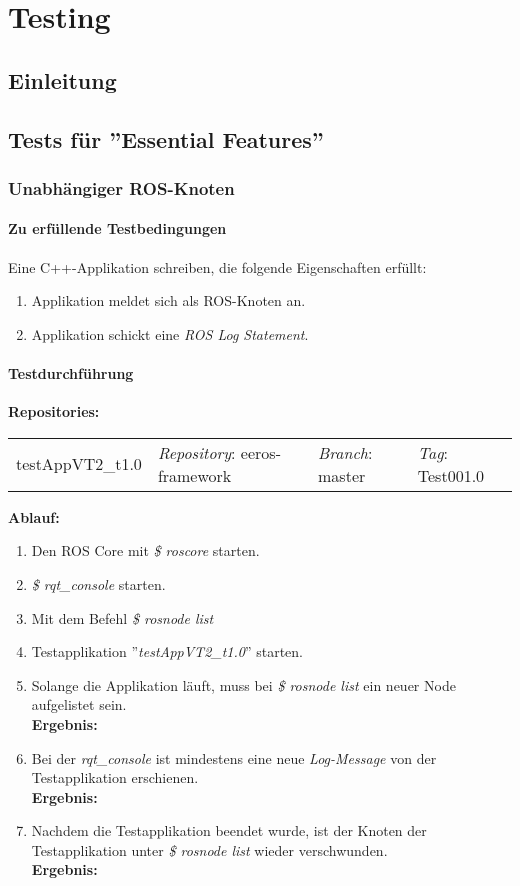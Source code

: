 \chapter{Testing}
\section{Einleitung}

\section{Tests für ''Essential Features''}
\subsection{Unabhängiger ROS-Knoten}
\subsubsection{Zu erfüllende Testbedingungen}
Eine C++-Applikation schreiben, die folgende Eigenschaften erfüllt:
\begin{enumerate}
\item Applikation meldet sich als ROS-Knoten an.
\item Applikation schickt eine \textit{ROS Log Statement}.
\end{enumerate}

\subsubsection{Testdurchführung}
\textbf{Repositories:} \\
\begin{tabular}
  { l						| l			 							l								 l								}
  testAppVT2\_t1.0			& \textit{Repository}: eeros-framework	& \textit{Branch}: master		& \textit{Tag}: Test001.0 		\\
\end{tabular}

\textbf{Ablauf: }
\begin{enumerate}
\item Den ROS Core mit \textit{\$ roscore} starten.
\item \textit{\$ rqt\_console} starten.
\item Mit dem Befehl \textit{\$ rosnode list} 
\item Testapplikation ''\textit{testAppVT2\_t1.0}'' starten.
\item Solange die Applikation läuft, muss bei \textit{\$ rosnode list} ein neuer Node aufgelistet sein. \\
\textbf{Ergebnis:} \checkmark
\item Bei der \textit{rqt\_console} ist mindestens eine neue \textit{Log-Message} von der Testapplikation erschienen. \\
\textbf{Ergebnis:} \checkmark
\item Nachdem die Testapplikation beendet wurde, ist der Knoten der Testapplikation unter \textit{\$ rosnode list} wieder verschwunden. \\
\textbf{Ergebnis:} \checkmark
\end{enumerate}


